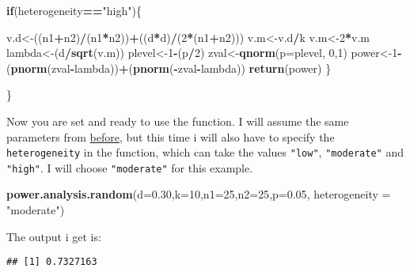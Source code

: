 \documentclass[]{book}
\newenvironment{Shaded}{\begin{snugshade}}{\end{snugshade}}
\newcommand{\KeywordTok}[1]{\textcolor[rgb]{0.13,0.29,0.53}{\textbf{#1}}}
\newcommand{\DataTypeTok}[1]{\textcolor[rgb]{0.13,0.29,0.53}{#1}}
\newcommand{\DecValTok}[1]{\textcolor[rgb]{0.00,0.00,0.81}{#1}}
\newcommand{\FloatTok}[1]{\textcolor[rgb]{0.00,0.00,0.81}{#1}}
\newcommand{\StringTok}[1]{\textcolor[rgb]{0.31,0.60,0.02}{#1}}
\newcommand{\ControlFlowTok}[1]{\textcolor[rgb]{0.13,0.29,0.53}{\textbf{#1}}}
\newcommand{\OperatorTok}[1]{\textcolor[rgb]{0.81,0.36,0.00}{\textbf{#1}}}
\newcommand{\NormalTok}[1]{#1}
\theoremstyle{definition}
\theoremstyle{definition}
\theoremstyle{definition}
\theoremstyle{remark}
\begin{document}
\begin{Shaded}
\begin{Highlighting}[]
    \ControlFlowTok{if}\NormalTok{(heterogeneity}\OperatorTok{==}\StringTok{"high"}\NormalTok{)\{}
    
\NormalTok{      v.d<-((n1}\OperatorTok{+}\NormalTok{n2)}\OperatorTok{/}\NormalTok{(n1}\OperatorTok{*}\NormalTok{n2))}\OperatorTok{+}\NormalTok{((d}\OperatorTok{*}\NormalTok{d)}\OperatorTok{/}\NormalTok{(}\DecValTok{2}\OperatorTok{*}\NormalTok{(n1}\OperatorTok{+}\NormalTok{n2)))}
\NormalTok{  v.m<-v.d}\OperatorTok{/}\NormalTok{k}
\NormalTok{  v.m<-}\DecValTok{2}\OperatorTok{*}\NormalTok{v.m}
\NormalTok{  lambda<-(d}\OperatorTok{/}\KeywordTok{sqrt}\NormalTok{(v.m))}
\NormalTok{  plevel<-}\DecValTok{1}\OperatorTok{-}\NormalTok{(p}\OperatorTok{/}\DecValTok{2}\NormalTok{)}
\NormalTok{  zval<-}\KeywordTok{qnorm}\NormalTok{(}\DataTypeTok{p=}\NormalTok{plevel, }\DecValTok{0}\NormalTok{,}\DecValTok{1}\NormalTok{)}
\NormalTok{  power<-}\DecValTok{1}\OperatorTok{-}\NormalTok{(}\KeywordTok{pnorm}\NormalTok{(zval}\OperatorTok{-}\NormalTok{lambda))}\OperatorTok{+}\NormalTok{(}\KeywordTok{pnorm}\NormalTok{(}\OperatorTok{-}\NormalTok{zval}\OperatorTok{-}\NormalTok{lambda))}
  \KeywordTok{return}\NormalTok{(power)}
\NormalTok{  \}}
    
\NormalTok{\}}
\end{Highlighting}
\end{Shaded}

Now you are set and ready to use the function. I will assume the same
parameters from \protect\hyperlink{fixed.power}{before}, but this time i
will also have to specify the \texttt{heterogeneity} in the function,
which can take the values \texttt{"low"}, \texttt{"moderate"} and
\texttt{"high"}. I will choose \texttt{"moderate"} for this example.

\begin{Shaded}
\begin{Highlighting}[]
\KeywordTok{power.analysis.random}\NormalTok{(}\DataTypeTok{d=}\FloatTok{0.30}\NormalTok{,}\DataTypeTok{k=}\DecValTok{10}\NormalTok{,}\DataTypeTok{n1=}\DecValTok{25}\NormalTok{,}\DataTypeTok{n2=}\DecValTok{25}\NormalTok{,}\DataTypeTok{p=}\FloatTok{0.05}\NormalTok{,}
                      \DataTypeTok{heterogeneity =} \StringTok{"moderate"}\NormalTok{)}
\end{Highlighting}
\end{Shaded}

The output i get is:

\begin{verbatim}
## [1] 0.7327163
\end{verbatim}
\end{document}
